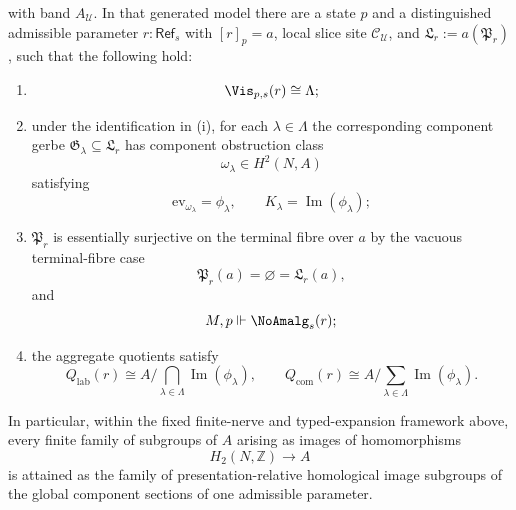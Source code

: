 \begin{theorem}
\[\]
with band \(A_{\mathcal U}\). In that generated model there are a state
\(p\) and a distinguished admissible parameter \(r:\mathsf{Ref}_s\) with
\([r]_p=a\), local slice site \(\mathcal C_{\mathcal U}\), and
\(\mathfrak L_r:=a(\mathfrak P_r)\), such that the following hold:
\begin{enumerate}[label=(\roman*),nosep]
\item
\[
\Vis_{p,s}(r)\cong \Lambda;
\]
\item under the identification in \textup{(i)}, for each $\lambda\in\Lambda$ the corresponding component gerbe $\mathfrak G_\lambda\subseteq \mathfrak L_r$ has component obstruction class
\[
\omega_\lambda\in H^2(N,A)
\]
satisfying
\[
\mathrm{ev}_{\omega_\lambda}=\phi_\lambda,
\qquad
K_\lambda=\operatorname{Im}(\phi_\lambda);
\]
\item $\mathfrak P_r$ is essentially surjective on the terminal fibre over $a$ by the vacuous terminal-fibre case
\[
\mathfrak P_r(a)=\varnothing=\mathfrak L_r(a),
\]
and
\[
M,p\Vdash \NoAmalg_s(r);
\]
\item the aggregate quotients satisfy
\[
Q_{\mathrm{lab}}(r)\cong A\Big/\bigcap_{\lambda\in\Lambda}\operatorname{Im}(\phi_\lambda),
\qquad
Q_{\mathrm{com}}(r)\cong A\Big/\sum_{\lambda\in\Lambda}\operatorname{Im}(\phi_\lambda).
\]
\end{enumerate}
In particular, within the fixed finite-nerve and typed-expansion
framework above, every finite family of subgroups of $A$ arising as images of homomorphisms
\[
H_2(N,\mathbb Z)\to A
\]
is attained as the family of presentation-relative homological image subgroups of the global component sections of one admissible parameter.
\end{theorem}


